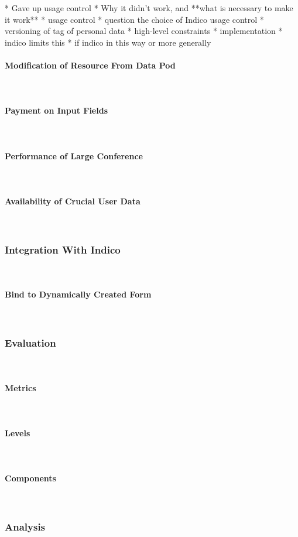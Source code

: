 * Gave up usage control
  * Why it didn't work, and **what is necessary to make it work**
    * usage control
    * question the choice of Indico usage control
    * versioning of tag of personal data
* high-level constraints
* implementation
  * indico limits this
* if indico in this way or more generally

\paragraph{Modification of Resource From Data Pod}\mbox{}\\

\paragraph{Payment on Input Fields}\mbox{}\\

\paragraph{Performance of Large Conference}\mbox{}\\

\paragraph{Availability of Crucial User Data}\mbox{}\\

\subsubsection{Integration With Indico}\mbox{}\\

\paragraph{Bind to Dynamically Created Form}\mbox{}\\

\subsubsection{Evaluation}\mbox{}\\

\paragraph{Metrics}\mbox{}\\
\paragraph{Levels}\mbox{}\\
\paragraph{Components}\mbox{}\\

\subsubsection{Analysis}\mbox{}\\
